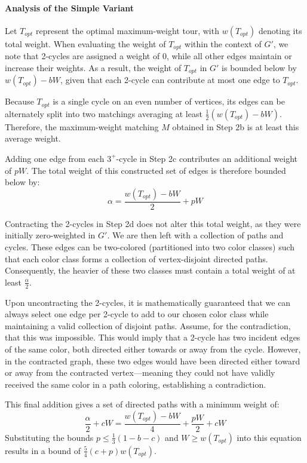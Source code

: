 \paragraph{Analysis of the Simple Variant}
Let $T_{opt}$ represent the optimal maximum-weight tour, with $w(T_{opt})$
denoting its total weight. When evaluating the weight of $T_{opt}$ within the
context of $G'$, we note that 2-cycles are assigned a weight of 0, while all
other edges maintain or increase their weights. As a result, the weight of
$T_{opt}$ in $G'$ is bounded below by $w(T_{opt}) - bW$, given that each 2-cycle
can contribute at most one edge to $T_{opt}$.

Because $T_{opt}$ is a single cycle on an even number of vertices, its edges can
be alternately split into two matchings averaging at least
$\frac{1}{2}(w(T_{opt}) - bW)$. Therefore, the maximum-weight matching $M$
obtained in Step 2b is at least this average weight.

Adding one edge from each $3^+$-cycle in Step 2c contributes an additional
weight of $pW$. The total weight of this constructed set of edges is therefore
bounded below by:
\begin{equation}
\alpha = \frac{w(T_{opt}) - bW}{2} + pW
\end{equation}

Contracting the 2-cycles in Step 2d does not alter this total weight, as they
were initially zero-weighted in $G'$. We are then left with a collection of
paths and cycles. These edges can be two-colored (partitioned into two color
classes) such that each color class forms a collection of vertex-disjoint
directed paths. Consequently, the heavier of these two classes must contain a
total weight of at least $\frac{\alpha}{2}$.

Upon uncontracting the 2-cycles, it is mathematically guaranteed that we can
always select one edge per 2-cycle to add to our chosen color class while
maintaining a valid collection of disjoint paths. Assume, for the contradiction,
that this was impossible. This would imply that a 2-cycle has two incident edges
of the same color, both directed either towards or away from the cycle. However,
in the contracted graph, these two edges would have been directed either toward
or away from the contracted vertex—meaning they could not have validly received
the same color in a path coloring, establishing a contradiction.

This final addition gives a set of directed paths with a minimum weight of:
\begin{equation}
\frac{\alpha}{2} + cW = \frac{w(T_{opt}) - bW}{4} + \frac{pW}{2} + cW
\end{equation}
Substituting the bounds $p \le \frac{1}{3}(1 - b - c)$ and $W \ge w(T_{opt})$
into this equation results in a bound of $\frac{5}{4}(c + p)w(T_{opt})$.

